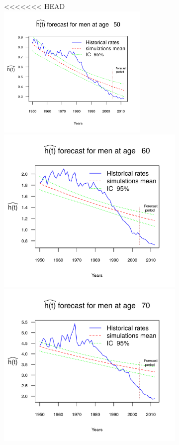 \documentclass[smallextended]{svjour3}
\begin{document}
\begin{figure}[H]
\begin{figure}[H]
<<<<<<< HEAD
    \includegraphics[width = 2.85in]{PlotMenForecast50.png}
    \includegraphics{PlotMenForecast60.png}
    \includegraphics{PlotMenForecast70.png}

\end{figure}
\end{figure}
\end{document}

